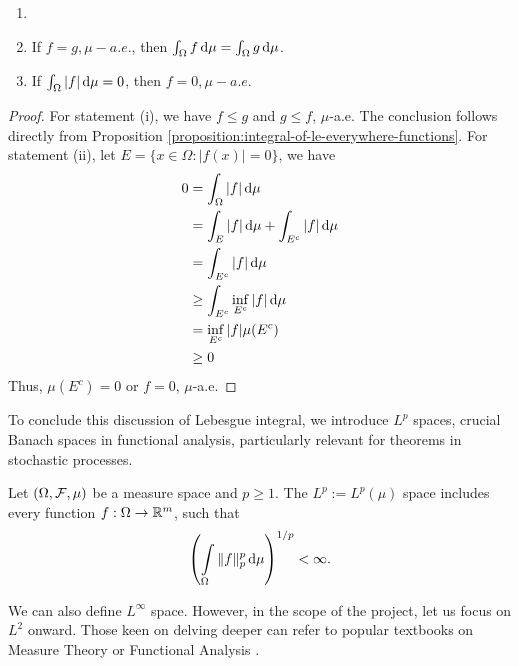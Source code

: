 \begin{corollary}
  \begin{enumerate}[label=(\roman*), ref=(\roman*)]
    \item []
    \item If $f = g, \mu-a.e.$, then $\int_\Omega f\,\mathrm{d} \mu =  \int_\Omega g\,\mathrm{d} \mu$.
    \item If $\int_\Omega |f|\,\mathrm{d} \mu = 0$, then $f=0,\mu-a.e.$
  \end{enumerate}
\end{corollary}

\begin{proof}
  For statement (i), we have $f\le g$ and $g\le f$, $\mu$-a.e. The conclusion follows directly from Proposition \ref{proposition:integral-of-le-everywhere-functions}. For statement (ii), let $E = \{x\in\Omega : |f(x)| = 0\}$, we have
  \begin{align*}
    0
     & = \int_\Omega |f|\,\mathrm{d} \mu                    \\
     & = \int_E |f|\,\mathrm{d} \mu + \int_{E^c} |f|\,\mathrm{d} \mu  \\
     & = \int_{E^c} |f|\,\mathrm{d} \mu                     \\
     & \ge \int_{E^c} \inf\limits_{E^c} |f|\,\mathrm{d} \mu \\
     & = \inf\limits_{E^c} |f| \mu (E^c)          \\
     & \ge 0
  \end{align*}
  Thus, $\mu (E^c)=0$ or $f=0$, $\mu$-a.e.
\end{proof}

To conclude this discussion of Lebesgue integral, we introduce $L^p$ spaces, crucial Banach spaces in functional analysis, particularly relevant for theorems in stochastic processes.

\begin{definition}
  \label{definition:Lp-space}
  Let $(\Omega,\mathcal{F},\mu)$ be a measure space and $p\ge1$. The $L^p := L^p(\mu)$ space includes every function $f:\Omega\to\mathbb{R}^m$, such that
  $$\left(\int\limits_\Omega \|f\|^p_p\,\mathrm{d} \mu\right)^{1/p}<\infty.$$
\end{definition}

\begin{remark}
  We can also define $L^\infty$ space. However, in the scope of the project, let us focus on $L^2$ onward. Those keen on delving deeper can refer to popular textbooks on Measure Theory \cite{cohn2013measure} or Functional Analysis \cite{rudin1987functional}.
\end{remark}

